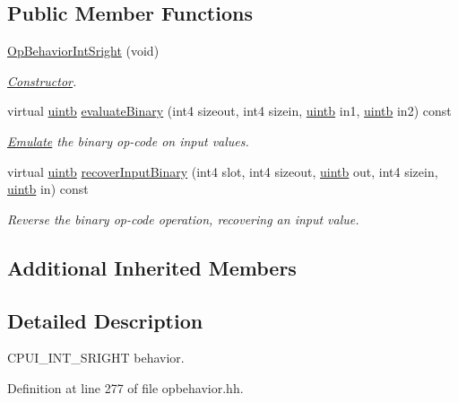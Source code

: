 \subsection*{Public Member Functions}
\begin{DoxyCompactItemize}
\item 
\mbox{\hyperlink{class_op_behavior_int_sright_ac67bee74a004ef2c272d234f033b7930}{Op\+Behavior\+Int\+Sright}} (void)
\begin{DoxyCompactList}\small\item\em \mbox{\hyperlink{class_constructor}{Constructor}}. \end{DoxyCompactList}\item 
virtual \mbox{\hyperlink{types_8h_a2db313c5d32a12b01d26ac9b3bca178f}{uintb}} \mbox{\hyperlink{class_op_behavior_int_sright_a967f44cf3750ee66485784adcd973bec}{evaluate\+Binary}} (int4 sizeout, int4 sizein, \mbox{\hyperlink{types_8h_a2db313c5d32a12b01d26ac9b3bca178f}{uintb}} in1, \mbox{\hyperlink{types_8h_a2db313c5d32a12b01d26ac9b3bca178f}{uintb}} in2) const
\begin{DoxyCompactList}\small\item\em \mbox{\hyperlink{class_emulate}{Emulate}} the binary op-\/code on input values. \end{DoxyCompactList}\item 
virtual \mbox{\hyperlink{types_8h_a2db313c5d32a12b01d26ac9b3bca178f}{uintb}} \mbox{\hyperlink{class_op_behavior_int_sright_ac22c09d6564cc3d35b8658ae57d10e43}{recover\+Input\+Binary}} (int4 slot, int4 sizeout, \mbox{\hyperlink{types_8h_a2db313c5d32a12b01d26ac9b3bca178f}{uintb}} out, int4 sizein, \mbox{\hyperlink{types_8h_a2db313c5d32a12b01d26ac9b3bca178f}{uintb}} in) const
\begin{DoxyCompactList}\small\item\em Reverse the binary op-\/code operation, recovering an input value. \end{DoxyCompactList}\end{DoxyCompactItemize}
\subsection*{Additional Inherited Members}


\subsection{Detailed Description}
C\+P\+U\+I\+\_\+\+I\+N\+T\+\_\+\+S\+R\+I\+G\+HT behavior. 

Definition at line 277 of file opbehavior.\+hh.



